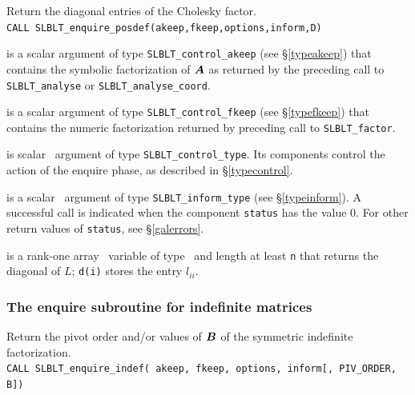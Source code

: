 \documentclass{galahad}
\newcommand{\packagename}{SLBLT}
\begin{document}
Return the diagonal entries of the Cholesky factor. \\

\hskip0.5in
{\tt CALL \packagename\_enquire\_posdef(akeep,fkeep,options,inform,D)}

\begin{description}
 is a scalar \intentin argument of type
{\tt \packagename\_control\_akeep} (see \S\ref{typeakeep}) that contains the 
symbolic factorization of ${\bm{A}}$ as returned by the preceding call
to {\tt \packagename\_analyse} or {\tt \packagename\_analyse\_coord}.

 is a scalar \intentin argument of type
{\tt \packagename\_control\_fkeep} (see \S\ref{typefkeep}) that contains the 
numeric factorization returned by preceding call to {\tt \packagename\_factor}.

 is scalar \intentin\ argument of type
{\tt \packagename\_control\_type}. Its components control the action
of the enquire phase, as described in \S\ref{typecontrol}.

 is a scalar \intentinout\ argument of type
{\tt \packagename\_inform\_type} (see \S\ref{typeinform}).
A successful call is indicated when the  component {\tt status} has the value 0.
For other return values of {\tt status}, see \S\ref{galerrors}.

 is a rank-one array \intentout\ variable of type \realdp\ and 
length at least {\tt n} that returns the diagonal of $L$; {\tt d(i)} 
stores the entry $l_{ii}$.

\end{description}


\subsubsection{The enquire subroutine for indefinite matrices}

Return the pivot order and/or values of ${\bm{B}}$ of the symmetric indefinite
factorization. \\

\hskip0.5in
{\tt CALL \packagename\_enquire\_indef( akeep, fkeep, options, inform{[}, PIV\_ORDER, B{]})}
\end{document}
